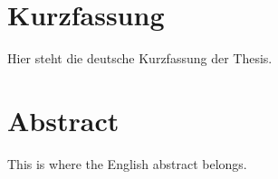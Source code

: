 \chapter*{Kurzfassung}
\thispagestyle{empty}

Hier steht die deutsche Kurzfassung der Thesis.


\chapter*{Abstract}
\thispagestyle{empty}

This is where the English abstract belongs.


